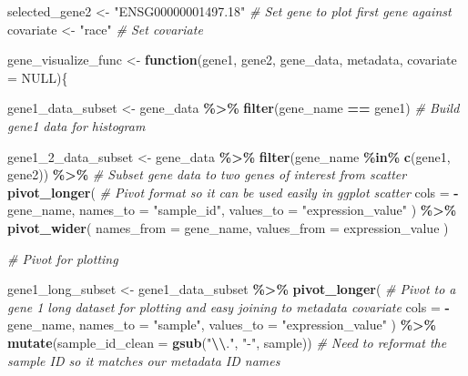 \documentclass[
]{article}
\newenvironment{Shaded}{\begin{snugshade}}{\end{snugshade}}
\newcommand{\AttributeTok}[1]{\textcolor[rgb]{0.13,0.29,0.53}{#1}}
\newcommand{\CommentTok}[1]{\textcolor[rgb]{0.56,0.35,0.01}{\textit{#1}}}
\newcommand{\ConstantTok}[1]{\textcolor[rgb]{0.56,0.35,0.01}{#1}}
\newcommand{\ControlFlowTok}[1]{\textcolor[rgb]{0.13,0.29,0.53}{\textbf{#1}}}
\newcommand{\FunctionTok}[1]{\textcolor[rgb]{0.13,0.29,0.53}{\textbf{#1}}}
\newcommand{\NormalTok}[1]{#1}
\newcommand{\OtherTok}[1]{\textcolor[rgb]{0.56,0.35,0.01}{#1}}
\newcommand{\SpecialCharTok}[1]{\textcolor[rgb]{0.81,0.36,0.00}{\textbf{#1}}}
\newcommand{\StringTok}[1]{\textcolor[rgb]{0.31,0.60,0.02}{#1}}
\begin{document}
\begin{Shaded}
\begin{Highlighting}[]
\NormalTok{selected\_gene2 }\OtherTok{\textless{}{-}} \StringTok{"ENSG00000001497.18"} \CommentTok{\# Set gene to plot first gene against }
\NormalTok{covariate }\OtherTok{\textless{}{-}} \StringTok{"race"} \CommentTok{\# Set covariate}

\NormalTok{gene\_visualize\_func }\OtherTok{\textless{}{-}} \ControlFlowTok{function}\NormalTok{(gene1, gene2, gene\_data, metadata, }\AttributeTok{covariate =} \ConstantTok{NULL}\NormalTok{)\{}
  
\NormalTok{  gene1\_data\_subset }\OtherTok{\textless{}{-}}\NormalTok{ gene\_data }\SpecialCharTok{\%\textgreater{}\%} 
    \FunctionTok{filter}\NormalTok{(gene\_name }\SpecialCharTok{==}\NormalTok{ gene1) }\CommentTok{\# Build gene1 data for histogram}
  
\NormalTok{  gene1\_2\_data\_subset }\OtherTok{\textless{}{-}}\NormalTok{ gene\_data }\SpecialCharTok{\%\textgreater{}\%}
    \FunctionTok{filter}\NormalTok{(gene\_name }\SpecialCharTok{\%in\%} \FunctionTok{c}\NormalTok{(gene1, gene2)) }\SpecialCharTok{\%\textgreater{}\%} \CommentTok{\# Subset gene data to two genes of interest from scatter}
    \FunctionTok{pivot\_longer}\NormalTok{( }\CommentTok{\# Pivot format so it can be used easily in ggplot scatter}
      \AttributeTok{cols =} \SpecialCharTok{{-}}\NormalTok{gene\_name,}
      \AttributeTok{names\_to =} \StringTok{"sample\_id"}\NormalTok{,}
      \AttributeTok{values\_to =} \StringTok{"expression\_value"}
\NormalTok{    ) }\SpecialCharTok{\%\textgreater{}\%}
    \FunctionTok{pivot\_wider}\NormalTok{(}
      \AttributeTok{names\_from =}\NormalTok{ gene\_name,}
      \AttributeTok{values\_from =}\NormalTok{ expression\_value}
\NormalTok{    )}
  
  \CommentTok{\# Pivot for plotting}
  
\NormalTok{  gene1\_long\_subset }\OtherTok{\textless{}{-}}\NormalTok{ gene1\_data\_subset }\SpecialCharTok{\%\textgreater{}\%}
  \FunctionTok{pivot\_longer}\NormalTok{( }\CommentTok{\# Pivot to a gene 1 long dataset for plotting and easy joining to metadata covariate}
    \AttributeTok{cols =} \SpecialCharTok{{-}}\NormalTok{gene\_name,}
    \AttributeTok{names\_to =} \StringTok{"sample"}\NormalTok{,}
    \AttributeTok{values\_to =} \StringTok{"expression\_value"}
\NormalTok{  ) }\SpecialCharTok{\%\textgreater{}\%} 
  \FunctionTok{mutate}\NormalTok{(}\AttributeTok{sample\_id\_clean =} \FunctionTok{gsub}\NormalTok{(}\StringTok{"}\SpecialCharTok{\textbackslash{}\textbackslash{}}\StringTok{."}\NormalTok{, }\StringTok{"{-}"}\NormalTok{, sample)) }\CommentTok{\# Need to reformat the sample ID so it matches our metadata ID names}
  

\end{Highlighting}
\end{Shaded}
\end{document}
